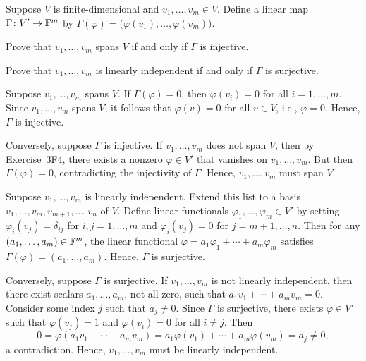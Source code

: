 \begin{exercise}
Suppose $V$ is finite-dimensional and $v_1,\dots,v_m\in V$. Define a linear map
$\Gamma\colon V'\to\mathbb{F}^m$ by
$\Gamma(\varphi)=\bigl(\varphi(v_1),\dots,\varphi(v_m)\bigr)$.
\begin{parts}
\item Prove that $v_1,\dots,v_m$ spans $V$ if and only if $\Gamma$ is injective.
\item Prove that $v_1,\dots,v_m$ is linearly independent if and only if
  $\Gamma$ is surjective.
\end{parts}
\end{exercise}
\begin{solution}\leavevmode
\begin{parts}
\item Suppose $v_1,\dots,v_m$ spans $V$. If $\Gamma(\varphi)=0$, then
  $\varphi(v_i)=0$ for all $i=1,\dots,m$. Since $v_1,\dots,v_m$ spans $V$, it
  follows that $\varphi(v)=0$ for all $v\in V$, i.e., $\varphi=0$. Hence,
  $\Gamma$ is injective.

  Conversely, suppose $\Gamma$ is injective. If $v_1,\dots,v_m$ does not span
  $V$, then by Exercise~3F4, there exists a nonzero $\varphi\in V'$ that
  vanishes on $v_1,\dots,v_m$. But then $\Gamma(\varphi)=0$, contradicting the
  injectivity of $\Gamma$. Hence, $v_1,\dots,v_m$ must span $V$.
\item Suppose $v_1,\dots,v_m$ is linearly independent. Extend this list to a
  basis $v_1,\dots,v_m,\allowbreak v_{m+1},\dots,v_n$ of $V$. Define linear functionals
  $\varphi_1,\dots,\varphi_m\in V'$ by setting $\varphi_i(v_j)=\delta_{ij}$ for
  $i,j=1,\dots,m$ and $\varphi_i(v_j)=0$ for $j=m+1,\dots,n$. Then for any
  $(a_1,\dots,a_m)\in\mathbb{F}^m$, the linear functional
  $\varphi=a_1\varphi_1+\cdots+a_m\varphi_m$ satisfies
  $\Gamma(\varphi)=(a_1,\dots,a_m)$. Hence, $\Gamma$ is surjective.

  Conversely, suppose $\Gamma$ is surjective. If $v_1,\dots,v_m$ is not
  linearly independent, then there exist scalars $a_1,\dots,a_m$, not all zero,
  such that $a_1v_1+\cdots+a_mv_m=0$. Consider some index $j$ such that
  $a_j\ne0$. Since $\Gamma$ is surjective, there exists $\varphi\in V'$ such
  that $\varphi(v_j)=1$ and $\varphi(v_i)=0$ for all $i\ne j$. Then
  \[ 0 = \varphi(a_1v_1+\cdots+a_mv_m)
       = a_1\varphi(v_1)+\cdots+a_m\varphi(v_m) = a_j\ne0, \]
  a contradiction. Hence, $v_1,\dots,v_m$ must be linearly independent.
  \qedhere
\end{parts}
\end{solution}

